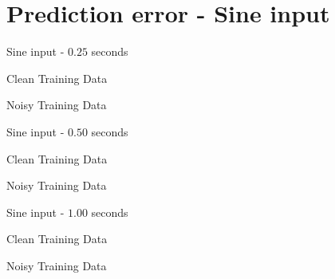 \documentclass{beamer}
\begin{document}
\section{Prediction error - Sine input}

\begin{frame}{Sine input - $0.25$ seconds}
    \scriptsize
    \begin{table}[!ht]
        \centering
        \caption{Clean Training Data}
    \end{table}

    \begin{table}[!ht]
        \centering
        \caption{Noisy Training Data}
    \end{table}
\end{frame}

\begin{frame}{Sine input - $0.50$ seconds}
    \scriptsize
    \begin{table}[!ht]
        \centering
        \caption{Clean Training Data}
    \end{table}

    \begin{table}[!ht]
        \centering
        \caption{Noisy Training Data}
    \end{table}
\end{frame}

\begin{frame}{Sine input - $1.00$ seconds}
    \scriptsize
    \begin{table}[!ht]
        \centering
        \caption{Clean Training Data}
    \end{table}

    \begin{table}[!ht]
        \centering
        \caption{Noisy Training Data}
    \end{table}
\end{frame}
\end{document}
